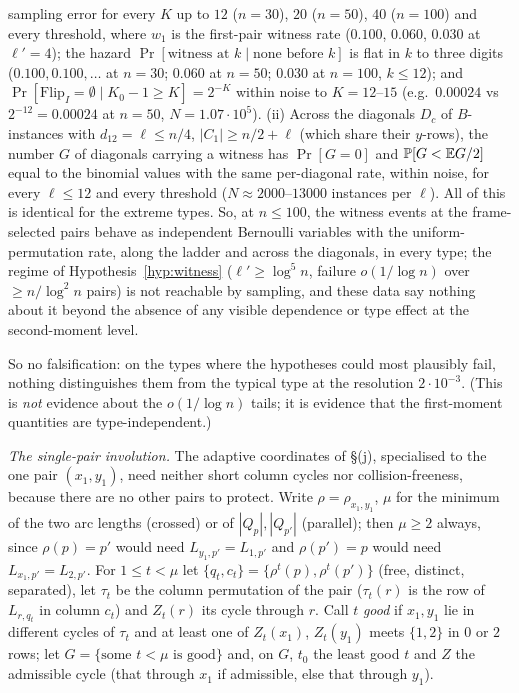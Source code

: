sampling error for every $K$ up to $12$ ($n=30$), $20$ ($n=50$), $40$
($n=100$) and every threshold, where $w_1$ is the first-pair witness
rate ($0.100$, $0.060$, $0.030$ at $\ell'=4$); the hazard
$\Pr[\text{witness at }k\mid\text{none before }k]$ is flat in $k$ to
three digits ($0.100,0.100,\dots$ at $n=30$; $0.060$ at $n=50$; $0.030$
at $n=100$, $k\le12$); and $\Pr[\mathrm{Flip}_I=\emptyset\mid K_0-1\ge K]=2^{-K}$
within noise to $K=12$--$15$ (e.g.\ $0.00024$ vs $2^{-12}=0.00024$ at
$n=50$, $N=1.07\cdot10^5$).  (ii) Across the diagonals $D_c$ of
$B$-instances with $d_{12}=\ell\le n/4$, $|C_1|\ge n/2+\ell$ (which
share their $y$-rows), the number $G$ of diagonals carrying a witness
has $\Pr[G=0]$ and $\mathbb{P}[G<\mathbb{E} G/2]$ equal to the binomial values with
the same per-diagonal rate, within noise, for every $\ell\le12$ and
every threshold ($N\approx2000$--$13000$ instances per $\ell$).  All of
this is identical for the extreme types.  So, at $n\le100$, the witness
events at the frame-selected pairs behave as independent Bernoulli
variables with the uniform-permutation rate, along the ladder and
across the diagonals, in every type; the regime of
Hypothesis~\ref{hyp:witness} ($\ell'\ge\log^5n$, failure $o(1/\log n)$
over $\ge n/\log^2n$ pairs) is not reachable by sampling, and these data
say nothing about it beyond the absence of any visible dependence or
type effect at the second-moment level.

So no falsification: on the types where the hypotheses could
most plausibly fail, nothing distinguishes them from the typical type
at the resolution $2\cdot10^{-3}$.  (This is \emph{not} evidence about
the $o(1/\log n)$ tails; it is evidence that the first-moment
quantities are type-independent.)

\emph{The single-pair involution.}  The adaptive coordinates of \S(j),
specialised to the one pair $(x_1,y_1)$, need neither short column
cycles nor collision-freeness, because there are no other pairs to
protect.  Write $\rho=\rho_{x_1,y_1}$, $\mu$ for the minimum of the two
arc lengths (crossed) or of $|Q_p|,|Q_{p'}|$ (parallel); then $\mu\ge2$
always, since $\rho(p)=p'$ would need $L_{y_1,p'}=L_{1,p'}$ and
$\rho(p')=p$ would need $L_{x_1,p'}=L_{2,p'}$.  For $1\le t<\mu$ let
$\{q_t,c_t\}=\{\rho^t(p),\rho^t(p')\}$ (free, distinct, separated), let
$\tau_t$ be the column permutation of the pair ($\tau_t(r)$ is the row
of $L_{r,q_t}$ in column $c_t$) and $Z_t(r)$ its cycle through $r$.
Call $t$ \emph{good} if $x_1,y_1$ lie in different cycles of $\tau_t$
and at least one of $Z_t(x_1)$, $Z_t(y_1)$ meets $\{1,2\}$ in $0$ or
$2$ rows; let $G=\{\text{some }t<\mu\text{ is good}\}$ and, on $G$,
$t_0$ the least good $t$ and $Z$ the admissible cycle (that through
$x_1$ if admissible, else that through $y_1$).

